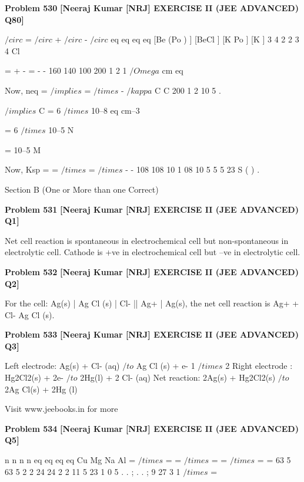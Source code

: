 \begin{problembox}
\textbf{Problem 530} \hfill \textbf{[Neeraj Kumar [NRJ] EXERCISE II (JEE ADVANCED) Q80]}
\label{q:ext-nrj_all_questions-530}

 $/circ$
=  $/circ$
+  $/circ$
- $/circ$
eq
eq
eq
eq
[Be (Po ) ]
[BeCl ]
[K Po ]
[K
]
3
4 2
2
3
4
Cl
 
 
=
+
-
=
-
-
160
140
100
200
1
2
1
$/Omega$
cm eq
 
 Now, neq =
$/implies$
=
$/times$
-
$/kappa$
C
C
200
1 2 10 5
.
 
 
 $/implies$ C = 6 $/times$ 10--8 eq cm--3 
 
           = 6 $/times$ 10--5 N
 
           = 10--5 M
 
 Now, Ksp =
=
$/times$
=
$/times$
-
-
108
108
10
1 08 10
5
5 5
23
S
(
)
.
 
Section B (One or More than one Correct)
\end{problembox}

\begin{problembox}
\textbf{Problem 531} \hfill \textbf{[Neeraj Kumar [NRJ] EXERCISE II (JEE ADVANCED) Q1]}
\label{q:ext-nrj_all_questions-531}

Net cell reaction is spontaneous in electrochemical 
cell but non-spontaneous in electrolytic cell. 
Cathode is +ve in electrochemical cell but --ve in 
electrolytic cell.
\end{problembox}

\begin{problembox}
\textbf{Problem 532} \hfill \textbf{[Neeraj Kumar [NRJ] EXERCISE II (JEE ADVANCED) Q2]}
\label{q:ext-nrj_all_questions-532}

For the cell: Ag(s) | Ag Cl (s) | Cl- || Ag+ | Ag(s), 
the net cell reaction is Ag+ + Cl-   Ag Cl (s).
\end{problembox}

\begin{problembox}
\textbf{Problem 533} \hfill \textbf{[Neeraj Kumar [NRJ] EXERCISE II (JEE ADVANCED) Q3]}
\label{q:ext-nrj_all_questions-533}

Left electrode: Ag(s) + Cl- (aq) $/to$ Ag Cl (s) + e- 1 $/times$ 2
Right electrode : Hg2Cl2(s) + 2e- $/to$ 2Hg(l) + 2 Cl- (aq)
Net reaction: 2Ag(s) + Hg2Cl2(s) $/to$ 2Ag Cl(s) + 2Hg (l)
 
 
Visit www.jeebooks.in for more
\end{problembox}

\begin{problembox}
\textbf{Problem 534} \hfill \textbf{[Neeraj Kumar [NRJ] EXERCISE II (JEE ADVANCED) Q5]}
\label{q:ext-nrj_all_questions-534}

n
n
n
n
eq
eq
eq
eq
Cu
Mg
Na
Al
=
$/times$
=
=
$/times$
=
=
$/times$ =
=
63 5
63 5
2
2
24
24
2
2
11 5
23
1
0 5
.
.
;
.
. ;
9
27
3
1
$/times$
=
\end{problembox}

